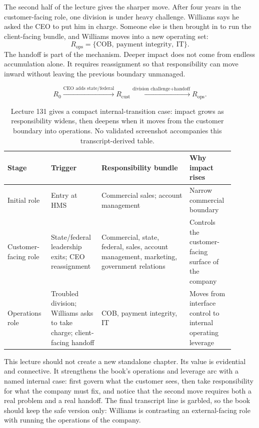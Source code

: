 \documentclass[11pt,oneside]{book}
\begin{document}
The second half of the lecture gives the sharper move. After four years in the customer-facing role, one division is under heavy challenge. Williams says he asked the CEO to put him in charge. Someone else is then brought in to run the client-facing bundle, and Williams moves into a new operating set:
\[
R_{\mathrm{ops}}=\{\text{COB},\ \text{payment integrity},\ \text{IT}\}.
\]
The handoff is part of the mechanism. Deeper impact does not come from endless accumulation alone. It requires reassignment so that responsibility can move inward without leaving the previous boundary unmanaged.

\[
R_0
\xrightarrow{\text{CEO adds state/federal}}
R_{\mathrm{cust}}
\xrightarrow{\text{division challenge}+\text{handoff}}
R_{\mathrm{ops}}.
\]

\begin{table}
\centering
\small
\begin{tabular}{p{0.16\linewidth}p{0.20\linewidth}p{0.36\linewidth}p{0.18\linewidth}}
\hline
Stage & Trigger & Responsibility bundle & Why impact rises \\
\hline
Initial role & Entry at HMS & Commercial sales; account management & Narrow commercial boundary \\
Customer-facing role & State/federal leadership exits; CEO reassignment & Commercial, state, federal, sales, account management, marketing, government relations & Controls the customer-facing surface of the company \\
Operations role & Troubled division; Williams asks to take charge; client-facing handoff & COB, payment integrity, IT & Moves from interface control to internal operating leverage \\
\hline
\end{tabular}
\caption{Lecture 131 gives a compact internal-transition case: impact grows as responsibility widens, then deepens when it moves from the customer boundary into operations. No validated screenshot accompanies this transcript-derived table.}
\end{table}

This lecture should not create a new standalone chapter. Its value is evidential and connective. It strengthens the book's operations and leverage arc with a named internal case: first govern what the customer sees, then take responsibility for what the company must fix, and notice that the second move requires both a real problem and a real handoff. The final transcript line is garbled, so the book should keep the safe version only: Williams is contrasting an external-facing role with running the operations of the company.
\end{document}
